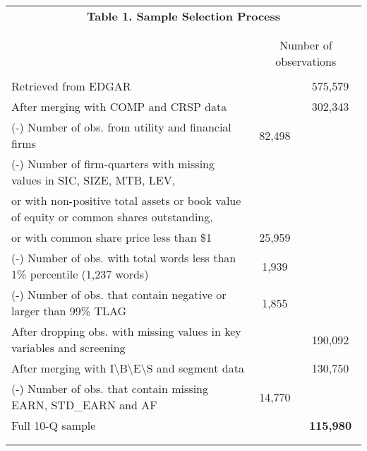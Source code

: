 \begin{table}[htbp] \label{T1}
  \centering
    \begin{tabular}{lcc}
    \multicolumn{3}{c}{\textbf{Table 1. Sample Selection Process}} \\ 
      & &  \\
    \begin{comment}
    \multicolumn{3}{c}{10-Q} \\
    &   \multicolumn{2}{c}{Number of observations}\\
    & &  \\
    Retrieved from EDGAR & & 575,579 \\
    After merging with COMP and CRSP data & & 302,343 \\
    (-) Number of obs. from utility and financial firms & 82,498 & \\
    (-) Number of firm-quarters with missing values in SIC, SIZE, MTB, LEV, & & \\
    \hspace{5mm}or with non-positive total assets or book value of equity or common shares outstanding, & & \\
    \hspace{5mm}or with common share price less than \$1 & 25,959 & \\
    (-) Number of obs. with total words less than 1\% percentile (1,237 words) & 1,939 & \\
    (-) Number of obs. that contain negative or larger than 99\% TLAG & 1,855 & \\
    \bottomrule
    After dropping obs. with missing values in key variables and screening & & 190,092 \\
    After merging with I\textbackslash{}B\textbackslash{}E\textbackslash{}S and segment data & & 130,750 \\
    (-) Number of obs. that contain missing EARN, STD\_EARN and AF & 14,770 & \\
    \bottomrule
    Full 10-Q sample & & \textbf{115,980} \\
    & &  \\
    \end{comment}
    

\end{tabular}
\end{table}
